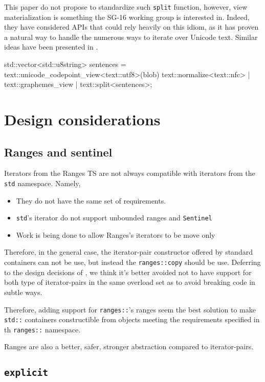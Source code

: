 \documentclass{wg21}
\newcommand{\cc}[1]{\texttt{#1}}
\begin{document}
This paper do not propose to standardize such \cc{split} function, however, view materialization is something the SG-16 working group is interested in.
Indeed, they have considered APIs that could rely heavily on this idiom, as it has proven a natural way to handle the numerous ways to iterate over Unicode text.
Similar ideas have been presented in \cite{P1004}.

\begin{codeblock}
	std::vector<std::u8string> sentences = 
		text::unicode_codepoint_view<text::utf8>(blob)  
		text::normalize<text::nfc> |
		text::graphemes_view | 
		text::split<sentences>;
\end{codeblock}

\section{Design considerations}


\subsection{Ranges and sentinel}

Iterators from the Ranges TS are not always compatible with iterators from the \cc{std} namespace.
Namely,
\begin{itemize}
	\item They do not have the same set of requirements.
	\item \cc{std}'s iterator do not support unbounded ranges and \cc{Sentinel}
	\item Work is being done to allow Ranges's iterators to be move only   
\end{itemize}

Therefore, in the general case, the iterator-pair constructor offered by standard containers can not be use, but instead the \cc{ranges::copy} should be use.
Deferring to the design decisions of \cite{P0896R3}, we think it's better avoided not to have support for both type of iterator-pairs in the same overload set
as to avoid breaking code in subtle ways.

Therefore, adding support for \cc{ranges::}'s ranges seem the best solution to make \cc{std::} containers constructible from objects meeting the requirements
specified in th \cc{ranges::} namespace.

Ranges are also a better, safer, stronger abstraction compared to iterator-pairs.

\subsection{\cc{explicit}}
\end{document}
